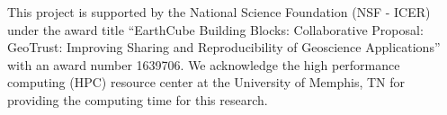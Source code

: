 \documentclass[draft]{agujournal2018}
\begin{document}
\acknowledgments
This project is supported by the National Science Foundation (NSF - ICER) under the award title ``EarthCube Building Blocks: Collaborative Proposal: GeoTrust: Improving Sharing and Reproducibility of Geoscience Applications'' with an award number 1639706. We acknowledge the high performance computing (HPC) resource center at the University of Memphis, TN for providing the computing time for this research. 






    




%
%
%
%
%
%
%
%
\end{document}
